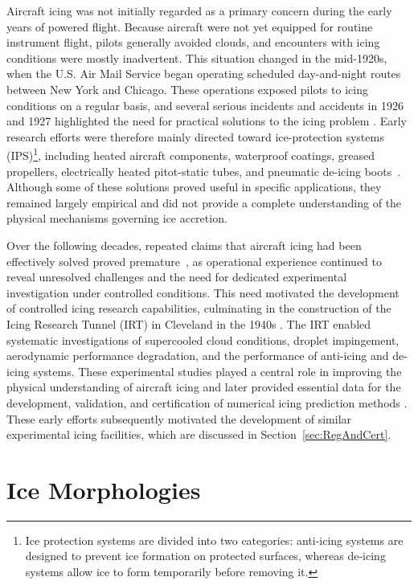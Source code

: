 Aircraft icing was not initially regarded as a primary concern during the early years of powered flight. Because aircraft were not yet equipped for routine instrument flight, pilots generally avoided clouds, and encounters with icing conditions were mostly inadvertent. This situation changed in the mid-1920s, when the U.S. Air Mail Service began operating scheduled day-and-night routes between New York and Chicago. These operations exposed pilots to icing conditions on a regular basis, and several serious incidents and accidents in 1926 and 1927 highlighted the need for practical solutions to the icing problem \cite{leary2002we}. Early research efforts were therefore mainly directed toward ice-protection systems (IPS)\footnote{Ice protection systems are divided into two categories: anti-icing systems are designed to prevent ice formation on protected surfaces, whereas de-icing systems allow ice to form temporarily before removing it.}, including heated aircraft components, waterproof coatings, greased propellers, electrically heated pitot-static tubes, and pneumatic de-icing boots~\cite{leary2002we}. Although some of these solutions proved useful in specific applications, they remained largely empirical and did not provide a complete understanding of the physical mechanisms governing ice accretion.

Over the following decades, repeated claims that aircraft icing had been effectively solved proved premature~\cite{leary2002we}, as operational experience continued to reveal unresolved challenges and the need for dedicated experimental investigation under controlled conditions. This need motivated the development of controlled icing research capabilities, culminating in the construction of the Icing Research Tunnel (IRT) in Cleveland in the 1940s \cite{leary2002we}. The IRT enabled systematic investigations of supercooled cloud conditions, droplet impingement, aerodynamic performance degradation, and the performance of anti-icing and de-icing systems. These experimental studies played a central role in improving the physical understanding of aircraft icing and later provided essential data for the development, validation, and certification of numerical icing prediction methods \cite{potapczuk1991icing}. These early efforts subsequently motivated the development of similar experimental icing facilities, which are discussed in Section~\ref{sec:RegAndCert}.
\section{Ice Morphologies}\label{sec:IceMorphologies}

